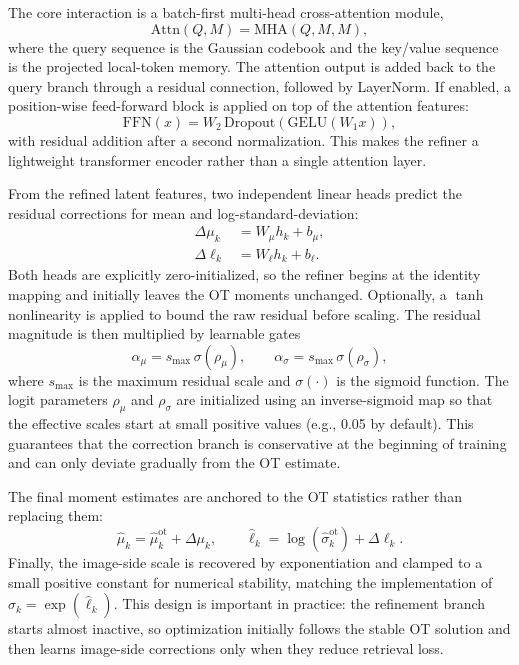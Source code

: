 \documentclass[journal]{IEEEtran}
\begin{document}
The core interaction is a batch-first multi-head cross-attention module,
\begin{equation}
\mathrm{Attn}(Q,M) = \mathrm{MHA}(Q,M,M),
\end{equation}
where the query sequence is the Gaussian codebook and the key/value sequence is the projected local-token memory. The attention output is added back to the query branch through a residual connection, followed by LayerNorm. If enabled, a position-wise feed-forward block is applied on top of the attention features:
\begin{equation}
\mathrm{FFN}(x) = W_2\,\mathrm{Dropout}(\mathrm{GELU}(W_1 x)),
\end{equation}
with residual addition after a second normalization. This makes the refiner a lightweight transformer encoder rather than a single attention layer.

From the refined latent features, two independent linear heads predict the residual corrections for mean and log-standard-deviation:
\begin{align}
\Delta \mu_k &= W_\mu h_k + b_\mu, \\
\Delta \ell_k &= W_\ell h_k + b_\ell.
\end{align}
Both heads are explicitly zero-initialized, so the refiner begins at the identity mapping and initially leaves the OT moments unchanged. Optionally, a \(\tanh\) nonlinearity is applied to bound the raw residual before scaling. The residual magnitude is then multiplied by learnable gates
\begin{equation}
\alpha_\mu = s_{\max}\,\sigma(\rho_\mu),\qquad
\alpha_\sigma = s_{\max}\,\sigma(\rho_\sigma),
\end{equation}
where \(s_{\max}\) is the maximum residual scale and \(\sigma(\cdot)\) is the sigmoid function. The logit parameters \(\rho_\mu\) and \(\rho_\sigma\) are initialized using an inverse-sigmoid map so that the effective scales start at small positive values (e.g., 0.05 by default). This guarantees that the correction branch is conservative at the beginning of training and can only deviate gradually from the OT estimate.

The final moment estimates are anchored to the OT statistics rather than replacing them:
\begin{equation}
\hat{\mu}_k = \hat{\mu}^{\mathrm{ot}}_k + \Delta \mu_k,\qquad
\hat{\ell}_k = \log(\hat{\sigma}^{\mathrm{ot}}_k) + \Delta \ell_k.
\end{equation}
Finally, the image-side scale is recovered by exponentiation and clamped to a small positive constant for numerical stability, matching the implementation of \(\hat{\sigma}_k = \exp(\hat{\ell}_k)\). This design is important in practice: the refinement branch starts almost inactive, so optimization initially follows the stable OT solution and then learns image-side corrections only when they reduce retrieval loss.
\end{document}
